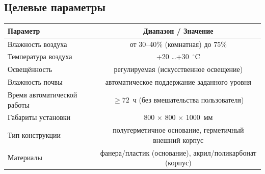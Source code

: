 \documentclass[a4paper,12pt]{article}
\begin{document}
\subsection*{Целевые параметры}
\begin{table}[h!]
\centering
\begin{tabular}{|l|c|}
\hline
\textbf{Параметр} & \textbf{Диапазон / Значение} \\ \hline
Влажность воздуха & от 30--40\% (комнатная) до 75\% \\ \hline
Температура воздуха & +20 \dots +30~$^{\circ}$C \\ \hline
Освещённость & регулируемая (искусственное освещение) \\ \hline
Влажность почвы & автоматическое поддержание заданного уровня \\ \hline
Время автоматической работы & $\geq 72$~ч (без вмешательства пользователя) \\ \hline
Габариты установки & 800 $\times$ 800 $\times$ 1000~мм \\ \hline
Тип конструкции & полугерметичное основание, герметичный внешний корпус \\ \hline
Материалы & фанера/пластик (основание), акрил/поликарбонат (корпус) \\ \hline
\end{tabular}
\end{table}
\end{document}
